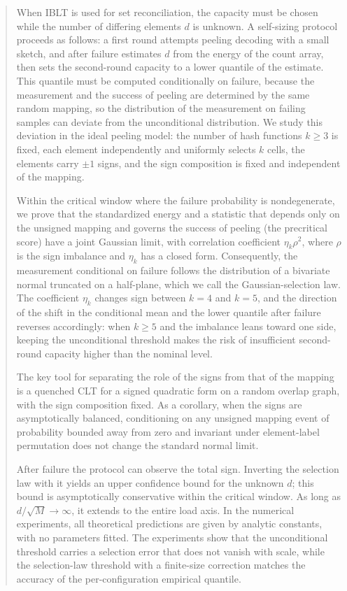 \begin{abstract}
When IBLT is used for set reconciliation, the capacity must be chosen while the number of differing elements $d$ is
unknown. A self-sizing protocol proceeds as follows: a first round attempts peeling decoding with a small sketch, and
after failure estimates $d$ from the energy of the count array, then sets the second-round capacity to a lower
quantile of the estimate. This quantile must be computed conditionally on failure, because the measurement and the
success of peeling are determined by the same random mapping, so the distribution of the measurement on failing
samples can deviate from the unconditional distribution. We study this deviation in the ideal peeling model: the
number of hash functions $k\ge3$ is fixed, each element independently and uniformly selects $k$ cells, the elements
carry $\pm1$ signs, and the sign composition is fixed and independent of the mapping.

Within the critical window where the failure probability is nondegenerate, we prove that the standardized energy and a
statistic that depends only on the unsigned mapping and governs the success of peeling (the precritical score) have a
joint Gaussian limit, with correlation coefficient
$\eta_k\rho^2$, where $\rho$ is the sign imbalance and $\eta_k$ has a closed form. Consequently, the
measurement conditional on failure follows the distribution of a bivariate normal truncated on a half-plane, which we
call the Gaussian-selection
law. The coefficient $\eta_k$ changes sign between $k=4$ and $k=5$, and the direction of the shift in the
conditional mean and the lower
quantile after failure reverses accordingly: when $k\ge5$ and the imbalance leans toward one side, keeping the
unconditional threshold
makes the risk of insufficient second-round capacity higher than the nominal level.

The key tool for separating the role of the signs from that of the mapping is a quenched CLT for a signed
quadratic form on a random overlap graph, with the sign composition fixed. As a corollary, when the signs are
asymptotically balanced, conditioning on any unsigned mapping event of probability bounded away from zero and
invariant under element-label permutation does not change the standard normal limit.

After failure the protocol can observe the total sign. Inverting the selection law with it yields an upper confidence
bound for the unknown $d$; this bound is asymptotically conservative within the critical window. As long as
$d/\sqrt M\to\infty$, it extends to the entire load axis. In the numerical experiments, all theoretical predictions
are given by analytic constants, with no parameters fitted. The experiments show that the unconditional threshold
carries a selection error that does not vanish with scale, while the selection-law threshold with a finite-size
correction matches the accuracy of the per-configuration empirical quantile.
\end{abstract}
